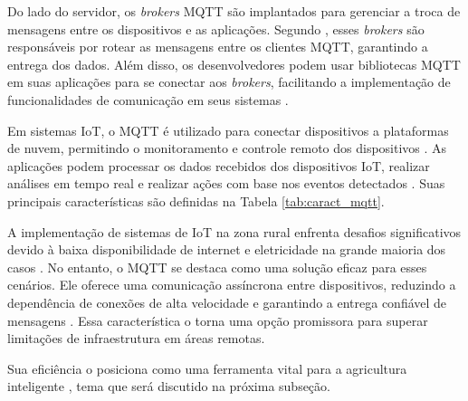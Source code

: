 Do lado do servidor, os \textit{brokers} MQTT são implantados para gerenciar a troca de mensagens entre os dispositivos e as aplicações. Segundo \textcite{Yassein_mqtt2017}, esses \textit{brokers} são responsáveis por rotear as mensagens entre os clientes MQTT, garantindo a entrega dos dados. Além disso, os desenvolvedores podem usar bibliotecas MQTT em suas aplicações para se conectar aos \textit{brokers}, facilitando a implementação de funcionalidades de comunicação em seus sistemas \parencite{MQTT_org}.

Em sistemas IoT, o MQTT é utilizado para conectar dispositivos a plataformas de nuvem, permitindo o monitoramento e controle remoto dos dispositivos \parencite{junior2022data}. As aplicações podem processar os dados recebidos dos dispositivos IoT, realizar análises em tempo real e realizar ações com base nos eventos detectados \parencite{ferrandez2018precision,hsu2020creative}. Suas principais características são definidas na Tabela \ref{tab:caract_mqtt}.

A implementação de sistemas de IoT na zona rural enfrenta desafios significativos devido à baixa disponibilidade de internet e eletricidade na grande maioria dos casos \parencite{rijswijk2021digital}. No entanto, o MQTT se destaca como uma solução eficaz para esses cenários. Ele oferece uma comunicação assíncrona entre dispositivos, reduzindo a dependência de conexões de alta velocidade e garantindo a entrega confiável de mensagens \parencite{Andy_mqtt2004, Yassein_mqtt2017}. Essa característica o torna uma opção promissora para superar limitações de infraestrutura em áreas remotas. 

Sua eficiência o posiciona como uma ferramenta vital para a agricultura inteligente \parencite{Gurjeet_smart2022}, tema que será discutido na próxima subseção.

